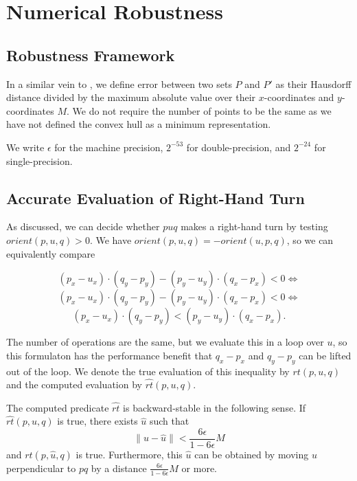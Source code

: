 \section{Numerical Robustness}



\subsection{Robustness Framework}

In a similar vein to \cite{Jiang06}, we define error between two sets
$P$ and $P'$ as their Hausdorff distance divided by the maximum absolute
value over their $x$-coordinates and $y$-coordinates $M$. We do not require
the number of points to be the same as we have not defined the convex hull
as a minimum representation. 

We write $\epsilon$ for the machine precision, $2^{-53}$ for double-precision, 
and $2^{-24}$ for single-precision.

\subsection{Accurate Evaluation of Right-Hand Turn}

As discussed, we can decide whether $puq$ makes a right-hand turn by testing
$orient(p, u, q) > 0$. We have $orient(p, u, q) = -orient(u, p, q)$, so
we can equivalently compare

$$(p_x - u_x) \cdot (q_y - p_y) - (p_y - u_y) \cdot (q_x - p_x) < 0 \iff$$
$$(p_x - u_x) \cdot (q_y - p_y) - (p_y - u_y) \cdot (q_x - p_x) < 0 \iff$$
$$(p_x - u_x) \cdot (q_y - p_y) < (p_y - u_y) \cdot (q_x - p_x).$$

The number of operations are the same, but we evaluate this in a loop over $u$, 
so this formulaton has the performance benefit that $q_x - p_x$ and $q_y - p_y$ 
can be lifted out of the loop. We denote the true evaluation of this inequality
by $rt(p, u, q)$ and the computed evaluation by $\widehat{rt}(p, u, q)$.

\begin{lemma}\label{lem:right-turn}
    The computed predicate $\widehat{rt}$ is backward-stable in the 
    following sense. If $\widehat{rt}(p, u, q)$ is true, there exists 
    $\hat{u}$ such that 
    $$\lVert u - \hat{u} \rVert < \frac{6\epsilon}{1 - 6\epsilon}M$$
    and $rt(p, \hat{u}, q)$ is true. Furthermore, this $\hat{u}$ can be
    obtained by moving $u$ perpendicular to $pq$ by a distance 
    $\frac{6\epsilon}{1 - 6\epsilon}M$ or more.
\end{lemma}

